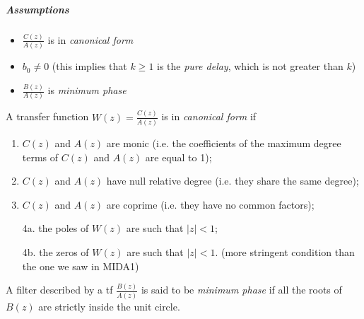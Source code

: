 \subparagraph{Assumptions}
\begin{itemize}
    \item $\frac{C(z)}{A(z)}$ is in \emph{canonical form}
    \item $b_0\ne 0$ (this implies that $k \ge 1$ is the \emph{pure delay}, which is not greater than $k$)
    \item $\frac{B(z)}{A(z)}$ is \emph{minimum phase}
\end{itemize}

\begin{rem}
    A transfer function $W(z) = \frac{C(z)}{A(z)}$ is in \emph{canonical form} if 
    \begin{enumerate}
        \item $C(z)$ and $A(z)$ are monic (i.e. the coefficients of the maximum degree terms of $C(z)$ and $A(z)$ are equal to 1);
        \item $C(z)$ and $A(z)$ have null relative degree (i.e. they share the same degree);
        \item $C(z)$ and $A(z)$ are coprime (i.e. they have no common factors);
        \item[4a.]the poles of $W(z)$ are such that $|z| < 1$;
        \item[4b.]the zeros of $W(z)$ are such that $|z| < 1$. (more stringent condition than the one we saw in MIDA1)
    \end{enumerate}
\end{rem}

\begin{rem}
    A filter described by a \gls{tf} $\frac{B(z)}{A(z)}$ is said to be \emph{minimum phase} if all the roots of $B(z)$ are strictly inside the unit circle.
\end{rem}

